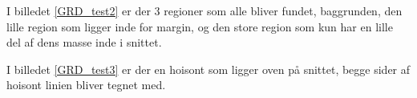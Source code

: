 I billedet \ref{GRD_test2} er der 3 regioner som
alle bliver fundet, baggrunden, den lille region som ligger inde for
margin, og den store region som kun har en lille del af dens masse inde
i snittet. 

\begin{figure}[!h]
    \centering
		\hspace{1em}
    	\hspace{1em}
        \caption[]{}
     \label{GRD_test2_sammen}
\end{figure}

I billedet \ref{GRD_test3} er der en hoisont som ligger oven på
snittet, begge sider af hoisont linien bliver tegnet med.

